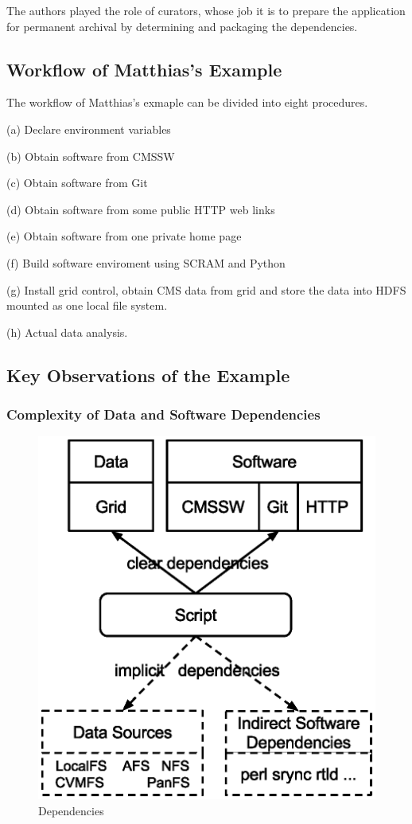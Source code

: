 \documentclass{acm_proc_article-sp}
\begin{document}
The authors played the role of curators, whose job it is to prepare the application for permanent archival by determining and packaging the dependencies.

\subsection{Workflow of Matthias's Example}

The workflow of Matthias's exmaple can be divided into eight procedures.

(a) Declare environment variables

(b) Obtain software from CMSSW

(c) Obtain software from Git

(d) Obtain software from some public HTTP web links

(e) Obtain software from one private home page

(f) Build software enviroment using SCRAM and Python

(g) Install grid control, obtain CMS data from grid and store the data into HDFS mounted as one local file system.

(h) Actual data analysis.

\subsection{Key Observations of the Example}

\subsubsection{Complexity of Data and Software Dependencies}

\begin{figure}[t]
\centering
\includegraphics[width=.8\columnwidth]{dependencies.eps}
\caption{Dependencies}
\label{fig:dependencies}
\end{figure}
\end{document}
